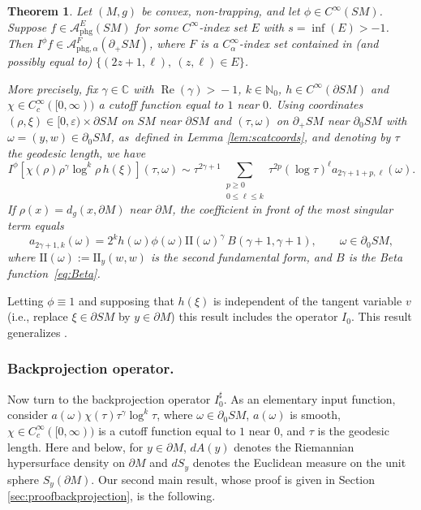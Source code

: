 \documentclass[11pt]{article}
\newcommand{\ie}{i.e.,\xspace}
\DeclareMathOperator{\Real}{Re}
\theoremstyle{plain}
\newtheorem{Theorem}{Theorem}[section]
\theoremstyle{definition}
\theoremstyle{remark}
\def\Cm{{\mathbb{C}}}
\def\Nm{{\mathbb{N}}}
\def\A{\mathcal{A}}
\def\two{\mathrm{II}}
\newcommand{\adj}{I_0^\sharp}
\newcommand{\del}{\partial}
\newcommand{\phg}{\mathrm{phg}}
\begin{document}
\begin{Theorem} \label{thm:Calphamapping}
Let $(M,g)$ be convex, non-trapping, and let $\phi\in C^\infty(SM)$. Suppose $f \in \A^E_{\phg}(SM)$ for some $C^\infty$-index set $E$ with
$s = \inf(E)>-1$. Then $I^\phi f \in \A^F_{\phg,\alpha}(\del_+ SM)$, where $F$ is a $C^\infty_\alpha$-index set contained in
(and possibly equal to) $\{ (2z+1,\ell), \ (z,\ell)\in E \}$.

More precisely, fix $\gamma\!\!\in\! \Cm$ with $\Real(\gamma)\!>\!-1$, $k\!\!\in\! \Nm_0$, $h\!\!\in\! C^\infty(\partial SM)$ and $\chi\!\!\in\! C_c^\infty([0,\infty))$ a cutoff function equal to $1$ near $0$.
Using coordinates $(\rho,\xi)\in [0,\varepsilon)\times \partial SM$ on $SM$ near $\partial SM$ and $(\tau,\omega)$ on $\partial_+ SM$ near
$\partial_0 SM$ with $\omega = (y,w)\in \partial_0 SM$, as~defined in Lemma \ref{lem:scatcoords}, and denoting by $\tau$ the geodesic length, we have
\begin{equation*}
I^\phi [\chi(\rho)\rho^\gamma \log^k \rho\,h(\xi)] (\tau,\omega) \sim \tau^{2\gamma+1} \sum_{\substack{p\ge 0 \\ 0 \le \ell \le k}} \tau^{2p} (\log\tau)^\ell
a_{2\gamma+1+p,\ell}(\omega).
\end{equation*}
If $\rho(x) = d_g(x,\partial M)$ near $\partial M$, the coefficient in front of the most singular term equals
\begin{equation}
a_{2\gamma+1,k}(\omega) = 2^k h(\omega) \phi(\omega) \two(\omega)^\gamma\ B(\gamma+1,\gamma+1), \qquad \omega\in \partial_0 SM,
\label{eq:I0BottomTerm}
\end{equation}
where $\two(\omega) \!:=\! \two_y(w,w)$ is the second fundamental form, and $B$ is the Beta function~\eqref{eq:Beta}.
\end{Theorem}
Letting $\phi \equiv 1$ and supposing that $h(\xi)$ is independent of the tangent variable $v$ (\ie replace $\xi\in \partial SM$ by $y\in \partial M$)
this result includes the operator $I_0$. This result generalizes \cite[Prop.\,6.13]{Monard2020a}.

\subsubsection*{Backprojection operator.} Now turn to the backprojection operator $\adj $. As an elementary input function, consider
$a(\omega) \chi(\tau) \tau^\gamma \log^k \tau$, where $\omega\in\partial_0 SM$, $a(\omega)$
is smooth, $\chi \in C_c^\infty([0,\infty))$ is a cutoff function equal to $1$ near $0$, and $\tau$ is the geodesic length. Here and below, for $y\in \partial M$, $dA(y)$ denotes the Riemannian hypersurface density on $\partial M$ and $dS_y$ denotes the Euclidean measure on the unit sphere $S_y (\partial M)$. Our second main result, whose proof is given in Section \ref{sec:proofbackprojection}, is the following.
\end{document}
